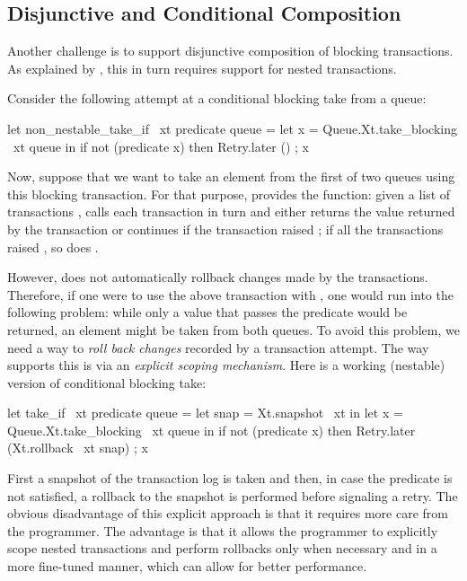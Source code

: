 \subsection{Disjunctive and Conditional Composition}
\label{sec:overview_disjunctive_composition}

Another challenge is to support disjunctive composition of blocking transactions.
As explained by \citet{DBLP:conf/ppopp/HarrisMPH05}, this in turn requires support for nested transactions.

Consider the following attempt at a conditional blocking take from a queue:
\begin{ocamlcode}
let non_nestable_take_if ~xt predicate queue =
  let x = Queue.Xt.take_blocking ~xt queue in
  if not (predicate x) then Retry.later () ;
  x
\end{ocamlcode}
Now, suppose that we want to take an element from the first of two queues using this blocking transaction.
For that purpose, \Kcas provides the  function: given a list of transactions ,  calls each transaction in turn and either returns the value returned by the transaction or continues if the transaction raised ; if all the transactions raised , so does .

However,  does not automatically rollback changes made by the transactions.
Therefore, if one were to use the above transaction with , one would run into the following problem: while only a value that passes the predicate would be returned, an element might be taken from both queues.
To avoid this problem, we need a way to \emph{roll back changes} recorded by a transaction attempt.
The way \Kcas supports this is via an \emph{explicit scoping mechanism}.
Here is a working (nestable) version of conditional blocking take:
\begin{ocamlcode}
let take_if ~xt predicate queue =
  let snap = Xt.snapshot ~xt in
  let x = Queue.Xt.take_blocking ~xt queue in
  if not (predicate x) then Retry.later (Xt.rollback ~xt snap) ;
  x
\end{ocamlcode}
First a snapshot of the transaction log is taken and then, in case the predicate is not satisfied, a rollback to the snapshot is performed before signaling a retry.
The obvious disadvantage of this explicit approach is that it requires more care from the programmer.
The advantage is that it allows the programmer to explicitly scope nested transactions and perform rollbacks only when necessary and in a more fine-tuned manner, which can allow for better performance.

